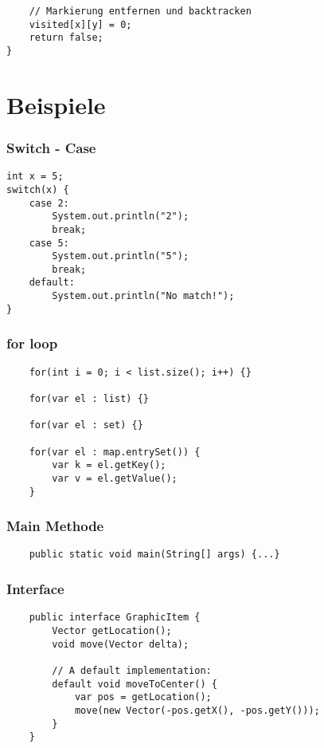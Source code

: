 \begin{multicols*}{5}
\begin{lstlisting}
	// Markierung entfernen und backtracken
	visited[x][y] = 0;
	return false;
}
			\end{lstlisting}


\section{Beispiele}

	\subsubsection{Switch - Case}
	\begin{lstlisting}
int x = 5; 
switch(x) {
	case 2: 
		System.out.println("2"); 
		break;
	case 5: 
		System.out.println("5"); 
		break;
	default: 
		System.out.println("No match!"); 
}
	\end{lstlisting}

	\subsubsection{for loop}
	\begin{lstlisting}
	for(int i = 0; i < list.size(); i++) {}
	
	for(var el : list) {}
	
	for(var el : set) {}
	
	for(var el : map.entrySet()) {
		var k = el.getKey();
		var v = el.getValue();
	}
	\end{lstlisting}

	\subsubsection{Main Methode}
	\begin{lstlisting}
	public static void main(String[] args) {...}	
	\end{lstlisting}

	\subsubsection{Interface}
	\begin{lstlisting}
	public interface GraphicItem {
		Vector getLocation();
		void move(Vector delta);
		
		// A default implementation:
		default void moveToCenter() {
			var pos = getLocation();
			move(new Vector(-pos.getX(), -pos.getY()));
		}
	}
	\end{lstlisting}

	\columnbreak


\end{multicols*}

